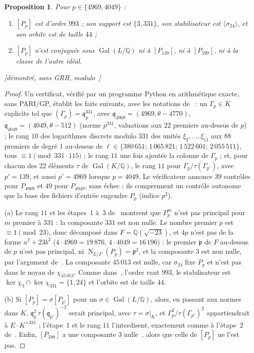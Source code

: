 \documentclass[11pt,a4paper]{amsart}
\theoremstyle{plain}
\newtheorem{proposition}{Proposition}[section]
\theoremstyle{definition}
\newcommand{\Q}{\mathbb{Q}}
\newcommand{\q}{\mathfrak{q}}
\DeclareMathOperator{\Nm}{N}
\DeclareMathOperator{\Gal}{Gal}
\newcommand{\st}[1]{\textup{\textsf{\small[#1]}}}
\begin{document}
\begin{proposition}\label{prop:classes}
Pour $p\in\{4969,4049\}$ :
\begin{enumerate}[label=\textup{(\alph*)}]
\item $[P_p]$ est d'ordre $993$ ; son support est $\{3,331\}$, son stabilisateur est $\langle\sigma_{24}\rangle$, et son orbite est de taille $44$ ;
\item $[P_p]$ n'est conjuguée sous $\Gal(L/\Q)$ ni à $[P_{139}]$, ni à $[P_{599}]$, ni à la classe de l'autre idéal.
\end{enumerate}
\st{démontré, sans GRH, modulo~\cite[prop.~2.2, 2.5]{Gau26}}
\end{proposition}

\begin{proof}
Un certificat, vérifié par un programme Python en arithmétique exacte, sans PARI/GP, établit les faits suivants, avec les notations de~\cite[\S6.4]{Gau26} : un $\Gamma_p\in K$ explicite tel que $(\Gamma_p)=\q_p^{331}$, avec $\q_{4969}=(4969,\theta-4770)$, $\q_{4049}=(4049,\theta-512)$ (norme $p^{331}$, valuations aux $22$ premiers au-dessus de $p$) ; le rang $10$ des logarithmes discrets modulo $331$ des unités $\xi_2,\dots,\xi_{11}$ aux $88$ premiers de degré $1$ au-dessus de $\ell\in\{380\,651;\,1\,065\,821;\,1\,522\,601;\,2\,055\,511\}$, tous $\equiv1\pmod{331\cdot115}$ ; le rang $11$ une fois ajoutée la colonne de $\Gamma_p$ ; et, pour chacun des $22$ éléments $\tau$ de $\Gal(K/\Q)$, le rang $11$ pour $\Gamma_p/\tau(\Gamma_{p'})$, avec $p'=139$, et aussi $p'=4969$ lorsque $p=4049$. Le vérificateur annonce $39$ contrôles pour $P_{4969}$ et $49$ pour $P_{4049}$, sans échec ; ils comprennent un contrôle autonome que la base des fichiers d'entrée engendre $P_p$ (indice $p^2$).

(a) Le rang $11$ et les étapes~1 à~3 de~\cite[\S6.4]{Gau26} montrent que $P_p^m$ n'est pas principal pour $m$ premier à $331$ : la composante $331$ est non nulle. Le nombre premier $p$ est $\equiv1\pmod{23}$, donc décomposé dans $F=\Q(\sqrt{-23})$, et $4p$ n'est pas de la forme $a^2+23b^2$ ($4\cdot4969=19\,876$, $4\cdot4049=16\,196$) : le premier $\mathfrak p$ de $F$ au-dessus de $p$ n'est pas principal, ni $\Nm_{L/F}(P_p)=\mathfrak p^2$, et la composante $3$ est non nulle, par l'argument de~\cite[rem.~6.8(a)]{Gau26}. La composante $45\,013$ est nulle, car $\sigma_{24}$ fixe $P_p$ et n'est pas dans le noyau de $\chi_{45\,013}$. Comme dans~\cite[rem.~6.8(a)]{Gau26}, l'ordre vaut $993$, le stabilisateur est $\ker\chi_3\cap\ker\chi_{331}=\{1,24\}$ et l'orbite est de taille $44$.

(b) Si $[P_p]=\sigma[P_{p'}]$ pour un $\sigma\in\Gal(L/\Q)$, alors, en passant aux normes dans $K$, $\q_p^2\,\tau(\q_{p'})^{-2}$ serait principal, avec $\tau=\sigma|_K$, et $\Gamma_p^2/\tau(\Gamma_{p'})^2$ appartiendrait à $E\cdot K^{\times331}$ ; l'étape~1 et le rang $11$ l'interdisent, exactement comme à l'étape~2 de~\cite[\S6.4]{Gau26}. Enfin, $[P_{599}]$ a une composante $3$ nulle~\cite[prop.~6.7]{Gau26}, alors que celle de $[P_p]$ ne l'est pas.
\end{proof}
\end{document}
